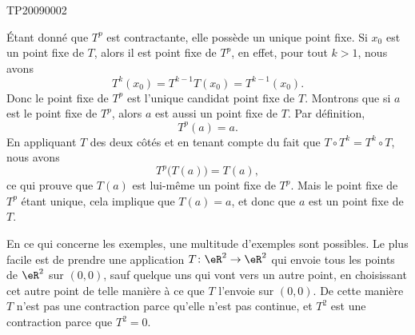 
\begin{corrige}{TP20090002}

	Étant donné que $T^p$ est contractante, elle possède un unique point fixe. Si $x_0$ est un point fixe de $T$, alors il est point fixe de $T^p$, en effet, pour tout $k>1$, nous avons
	\begin{equation}
		T^k(x_0)=T^{k-1}T(x_0)=T^{k-1}(x_0).
	\end{equation}
	Donc le point fixe de $T^p$ est l'unique candidat point fixe de $T$. Montrons que si $a$ est le point fixe de $T^p$, alors $a$ est aussi un point fixe de $T$. Par définition,
	\begin{equation}
		T^p(a)=a.
	\end{equation}
	En appliquant $T$ des deux côtés et en tenant compte du fait que $T\circ T^k=T^k\circ T$, nous avons
	\begin{equation}
		T^p\big( T(a) \big)=T(a),
	\end{equation}
	ce qui prouve que $T(a)$ est lui-même un point fixe de $T^p$. Mais le point fixe de $T^p$ étant unique, cela implique que $T(a)=a$, et donc que $a$ est un point fixe de $T$.

	En ce qui concerne les exemples, une multitude d'exemples sont possibles. Le plus facile est de prendre une application $T\colon \eR^2\to \eR^2$ qui envoie tous les points de $\eR^2$ sur $(0,0)$, sauf quelque uns qui vont vers un autre point, en choisissant cet autre point de telle manière à ce que $T$ l'envoie sur $(0,0)$. De cette manière $T$ n'est pas une contraction parce qu'elle n'est pas continue, et $T^2$ est une contraction parce que $T^2=0$.

\end{corrige}
